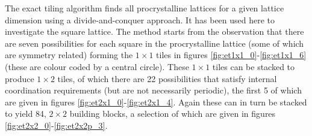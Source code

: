 The exact tiling algorithm finds all procrystalline lattices for a given lattice dimension using a divide\--and\--conquer approach.
It has been used here to investigate the square lattice.
The method starts from the observation that there are seven possibilities for each square in the procrystalline lattice (some of which are symmetry related) forming the $1\times 1$ tiles in figures \ref{fig:et1x1_0}\--\ref{fig:et1x1_6} (these are colour coded by a central circle).
These $1\times 1$ tiles can be stacked to produce $1\times 2$ tiles, of which there are 22 possibilities that satisfy internal coordination requirements (but are not necessarily periodic), the first 5 of which are given in figures \ref{fig:et2x1_0}\--\ref{fig:et2x1_4}.
Again these can in turn be stacked to yield 84, $2\times 2$ building blocks, a selection of which are given in figures \ref{fig:et2x2_0}\--\ref{fig:et2x2p_3}.

